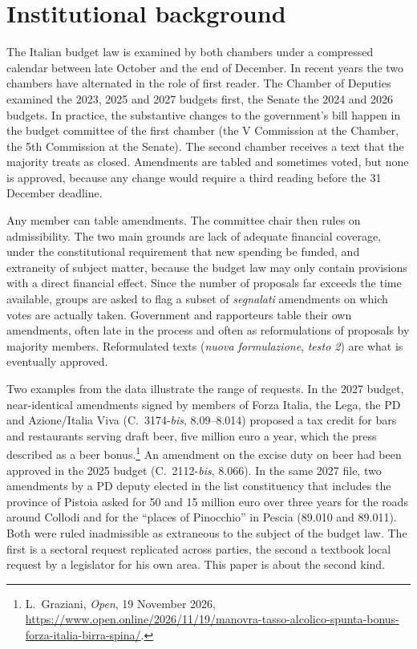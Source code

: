 \documentclass[12pt]{article}
\begin{document}
\section{Institutional background}\label{sec:background}

The Italian budget law is examined by both chambers under a compressed calendar between late October and the end of December. In recent years the two chambers have alternated in the role of first reader. The Chamber of Deputies examined the 2023, 2025 and 2027 budgets first, the Senate the 2024 and 2026 budgets. In practice, the substantive changes to the government's bill happen in the budget committee of the first chamber (the V Commission at the Chamber, the 5th Commission at the Senate). The second chamber receives a text that the majority treats as closed. Amendments are tabled and sometimes voted, but none is approved, because any change would require a third reading before the 31 December deadline.

Any member can table amendments. The committee chair then rules on admissibility. The two main grounds are lack of adequate financial coverage, under the constitutional requirement that new spending be funded, and extraneity of subject matter, because the budget law may only contain provisions with a direct financial effect. Since the number of proposals far exceeds the time available, groups are asked to flag a subset of \emph{segnalati} amendments on which votes are actually taken. Government and rapporteurs table their own amendments, often late in the process and often as reformulations of proposals by majority members. Reformulated texts (\emph{nuova formulazione}, \emph{testo 2}) are what is eventually approved.

Two examples from the data illustrate the range of requests. In the 2027 budget, near-identical amendments signed by members of Forza Italia, the Lega, the PD and Azione/Italia Viva (C.~3174-\emph{bis}, 8.09--8.014) proposed a tax credit for bars and restaurants serving draft beer, five million euro a year, which the press described as a beer bonus.\footnote{L.~Graziani, \emph{Open}, 19 November 2026, \url{https://www.open.online/2026/11/19/manovra-tasso-alcolico-spunta-bonus-forza-italia-birra-spina/}.} An amendment on the excise duty on beer had been approved in the 2025 budget (C.~2112-\emph{bis}, 8.066). In the same 2027 file, two amendments by a PD deputy elected in the list constituency that includes the province of Pistoia asked for 50 and 15 million euro over three years for the roads around Collodi and for the ``places of Pinocchio'' in Pescia (89.010 and 89.011). Both were ruled inadmissible as extraneous to the subject of the budget law. The first is a sectoral request replicated across parties, the second a textbook local request by a legislator for his own area. This paper is about the second kind.
\end{document}
